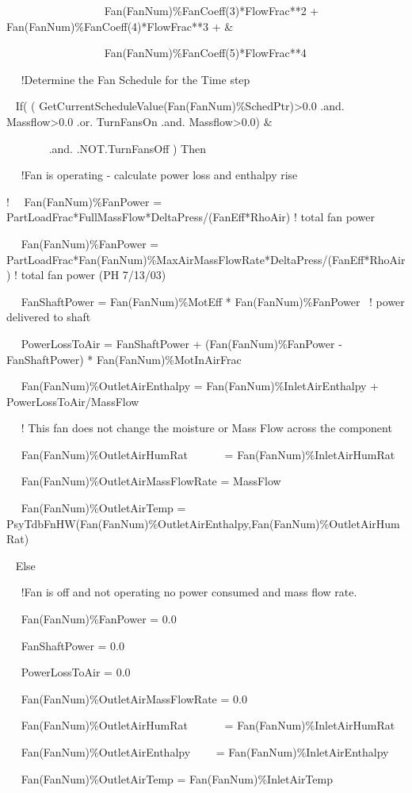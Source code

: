 ~~~~~~~~~~~~~~~~~ Fan(FanNum)\%FanCoeff(3)*FlowFrac**2 + Fan(FanNum)\%FanCoeff(4)*FlowFrac**3 + \&

~~~~~~~~~~~~~~~~~ Fan(FanNum)\%FanCoeff(5)*FlowFrac**4

~~ !Determine the Fan Schedule for the Time step

~ If( ( GetCurrentScheduleValue(Fan(FanNum)\%SchedPtr)\textgreater{}0.0 .and. Massflow\textgreater{}0.0 .or. TurnFansOn .and. Massflow\textgreater{}0.0) \&

~~~~~~~ .and. .NOT.TurnFansOff ) Then

~~ !Fan is operating - calculate power loss and enthalpy rise

!~~ Fan(FanNum)\%FanPower = PartLoadFrac*FullMassFlow*DeltaPress/(FanEff*RhoAir) ! total fan power

~~ Fan(FanNum)\%FanPower = PartLoadFrac*Fan(FanNum)\%MaxAirMassFlowRate*DeltaPress/(FanEff*RhoAir) ! total fan power (PH 7/13/03)

~~ FanShaftPower = Fan(FanNum)\%MotEff * Fan(FanNum)\%FanPower~ ! power delivered to shaft

~~ PowerLossToAir = FanShaftPower + (Fan(FanNum)\%FanPower - FanShaftPower) * Fan(FanNum)\%MotInAirFrac

~~ Fan(FanNum)\%OutletAirEnthalpy = Fan(FanNum)\%InletAirEnthalpy + PowerLossToAir/MassFlow

~~ ! This fan does not change the moisture or Mass Flow across the component

~~ Fan(FanNum)\%OutletAirHumRat~~~~~~ = Fan(FanNum)\%InletAirHumRat

~~ Fan(FanNum)\%OutletAirMassFlowRate = MassFlow

~~ Fan(FanNum)\%OutletAirTemp = PsyTdbFnHW(Fan(FanNum)\%OutletAirEnthalpy,Fan(FanNum)\%OutletAirHumRat)

~ Else

~~ !Fan is off and not operating no power consumed and mass flow rate.

~~ Fan(FanNum)\%FanPower = 0.0

~~ FanShaftPower = 0.0

~~ PowerLossToAir = 0.0

~~ Fan(FanNum)\%OutletAirMassFlowRate = 0.0

~~ Fan(FanNum)\%OutletAirHumRat~~~~~~ = Fan(FanNum)\%InletAirHumRat

~~ Fan(FanNum)\%OutletAirEnthalpy~~~~ = Fan(FanNum)\%InletAirEnthalpy

~~ Fan(FanNum)\%OutletAirTemp = Fan(FanNum)\%InletAirTemp

